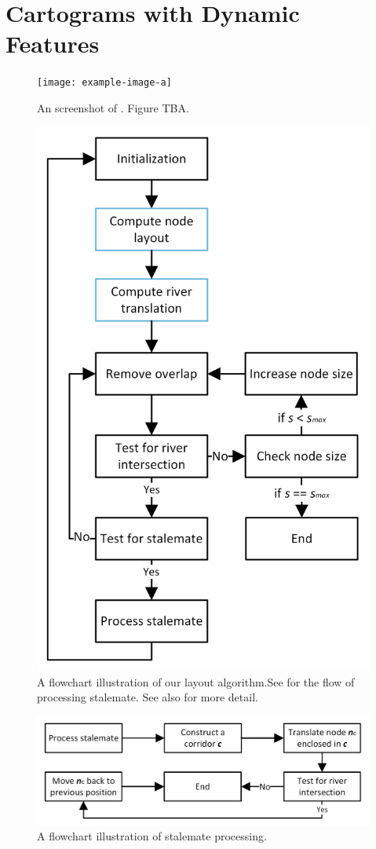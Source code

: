 \section{Cartograms with Dynamic Features}

{
\begin{figure}[tb!]
    \centering
    \texttt{[image: example-image-a]}
    \caption{An screenshot of \software. Figure TBA.}
    \label{fig:overview}
\end{figure}
}

{
    \begin{figure}[tb!]
        \centering
        \includegraphics[width=0.8\columnwidth]{figure/flowchart.png}
        \caption{A flowchart illustration of our layout algorithm.See  for the flow of processing stalemate. See also  for more detail.}
        \label{fig:flowchart}
    \end{figure}

    \begin{figure}[tb!]
        \centering
        \includegraphics[width=0.9\columnwidth]{figure/flowchart stalemate.png}
        \caption{A flowchart illustration of stalemate processing.}
        \label{fig:flowchart-stalemate}
    \end{figure}
}


